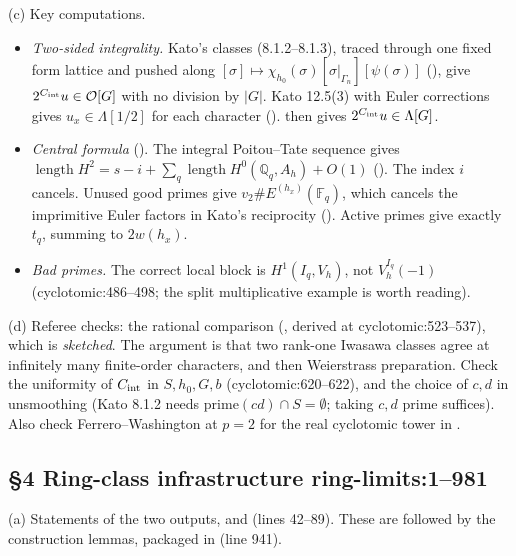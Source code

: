 \documentclass[11pt]{article}
\theoremstyle{remark}
\newcommand{\Q}{\mathbb Q}
\newcommand{\F}{\mathbb F}
\newcommand{\cO}{\mathcal O}
\DeclareMathOperator{\length}{length}
\newcommand{\src}[2]{\textsf{\small #1:#2}}
\begin{document}
(c) Key computations.
\begin{itemize}
\item \emph{Two-sided integrality.} Kato's classes (8.1.2--8.1.3), traced
 through one fixed form lattice and pushed along
 $[\sigma]\mapsto\chi_{h_0}(\sigma)[\sigma|_{\Gamma_n}][\psi(\sigma)]$
 (), give $2^{C_{\rm int}}u\in\cO[G]$ with no
 division by $|G|$. Kato 12.5(3) with Euler corrections gives
 $u_x\in\Lambda[1/2]$ for each character ().
  then gives $2^{C_{\rm int}}u\in\Lambda[G]$.
\item \emph{Central formula} (). The integral Poitou--Tate
 sequence gives $\length H^2=s-i+\sum_q\length H^0(\Q_q,A_h)+O(1)$
 (). The index $i$ cancels. Unused good primes give
 $v_2\#E^{(h_x)}(\F_q)$, which cancels the imprimitive Euler factors in
 Kato's reciprocity (). Active primes give exactly
 $t_q$, summing to $2w(h_x)$.
\item \emph{Bad primes.} The correct local block is $H^1(I_q,V_h)$, not
 $V_h^{I_q}(-1)$ (\src{cyclotomic}{486--498}; the split multiplicative
 example is worth reading).
\end{itemize}

(d) Referee checks: the rational comparison (,
derived at \src{cyclotomic}{523--537}), which is \emph{sketched}. The
argument is that two rank-one Iwasawa classes agree at infinitely many
finite-order characters, and then Weierstrass preparation. Check the
uniformity of $C_{\rm int}$ in $S,h_0,G,b$ (\src{cyclotomic}{620--622}), and
the choice of $c,d$ in unsmoothing (Kato 8.1.2 needs $\mathrm{prime}(cd)\cap
S=\emptyset$; taking $c,d$ prime suffices). Also check Ferrero--Washington at
$p=2$ for the real cyclotomic tower in .

\subsection*{\S4 Ring-class infrastructure \hfill \src{ring-limits}{1--981}}
(a) Statements of the two outputs,  and
 (lines 42--89). These are followed by the
construction lemmas, packaged in 
(line 941).
\end{document}
